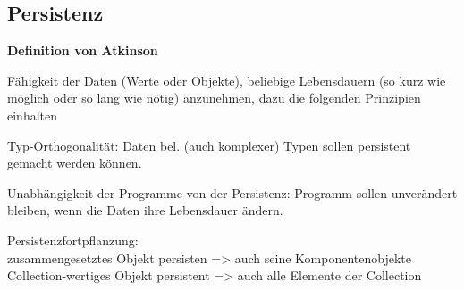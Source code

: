 \newpage
\subsection{Persistenz}
\begin{framed}
	\textbf{Definition von Atkinson}
	\begin{description}
		\item Fähigkeit der Daten (Werte oder Objekte), beliebige Lebensdauern (so kurz wie möglich oder so lang wie nötig) anzunehmen, dazu die folgenden Prinzipien einhalten
		\item Typ-Orthogonalität: Daten bel. (auch komplexer) Typen sollen persistent gemacht werden können.
		\item Unabhängigkeit der Programme von der Persistenz: Programm sollen unverändert bleiben, wenn die Daten ihre Lebensdauer ändern.
		\item Persistenzfortpflanzung:\\
		zusammengesetztes Objekt persisten => auch seine Komponentenobjekte\\
		Collection-wertiges Objekt persistent => auch alle Elemente der Collection
	\end{description}
\end{framed}

